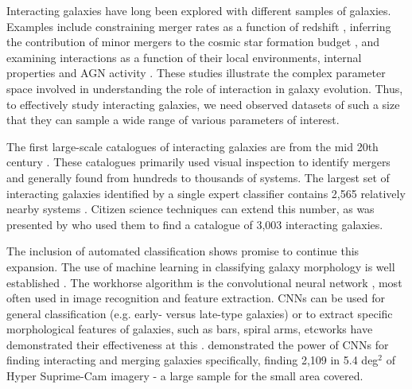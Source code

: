 Interacting galaxies have long been explored with different samples of galaxies. Examples include constraining merger rates as a function of redshift \citep{2008ApJ...672..177L}, inferring the contribution of minor mergers to the cosmic star formation budget \citep{2014MNRAS.440.2944K, 2014MNRAS.437L..41K}, and examining interactions as a function of their local environments, internal properties and AGN activity \citep{2010MNRAS.401.1552D}. These studies \citep[and many others; for further examples, see][]{2000ApJ...530..660B, 2004MNRAS.352.1081A, 2013MNRAS.435.3627E, 2016MNRAS.459..720H, 2021ApJ...909..124S} illustrate the complex parameter space involved in understanding the role of interaction in galaxy evolution. Thus, to effectively study interacting galaxies, we need observed datasets of such a size that they can sample a wide range of various parameters of interest.

The first large-scale catalogues of interacting galaxies are from the mid 20th century \citep[][hereafter VV]{1966ApJS...14....1A, 1959VV....C......0V, 1977A&AS...28....1V}. These catalogues primarily used visual inspection to identify mergers \citep[e.g.,][]{1997ApJS..108...99D, 2010ApJS..186..427N} and generally found from hundreds to thousands of systems. The largest set of interacting galaxies identified by a single expert classifier contains 2,565 relatively nearby systems \citep{1987cspg.book.....A}. Citizen science techniques can extend this number, as was presented by \citet{2010MNRAS.401.1552D} who used them to find a catalogue of 3,003 interacting galaxies.

The inclusion of automated classification shows promise to continue this expansion. The use of machine learning in classifying galaxy morphology is well established \citep{1996VA.....40..401A, 2017NatSR...7.4463A, 2020A&C....3000334B, 2020ApJ...895..112G, 2021MNRAS.503.4446C}. The workhorse algorithm is the convolutional neural network \citep[CNN; for an introduction, see][]{2015arXiv151108458O}, most often used in image recognition and feature extraction. CNNs can be used for general classification (e.g. early- versus late-type galaxies) or to extract specific morphological features of galaxies, such as bars, spiral arms, etc\DIFdelbegin {}\DIFdelend \DIFaddbegin {}\DIFaddend works have demonstrated their effectiveness at this \citep[e.g.][]{2018MNRAS.479..415A, 2019ApJS..243...17J, 2021MNRAS.504..372B, 2021arXiv211101154B, 2022MNRAS.509.3966W}. \citet{2022A&A...661A..52P} demonstrated the power of CNNs for finding interacting and merging galaxies specifically, finding 2,109 in 5.4 deg$^2$ of Hyper Suprime-Cam imagery - a large sample for the small area covered.

